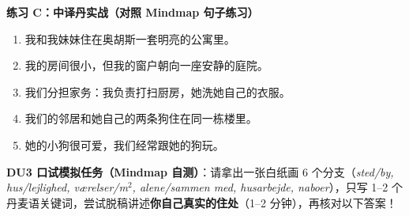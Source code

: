 \textbf{练习 C：中译丹实战（对照 Mindmap 句子练习）}
\begin{enumerate}
  \item 我和我妹妹住在奥胡斯一套明亮的公寓里。
  \item 我的房间很小，但我的窗户朝向一座安静的庭院。
  \item 我们分担家务：我负责打扫厨房，她洗她自己的衣服。
  \item 我们的邻居和她自己的两条狗住在同一栋楼里。
  \item 她的小狗很可爱，我们经常跟她的狗玩。
\end{enumerate}


\textbf{DU3 口试模拟任务（Mindmap 自测）}：请拿出一张白纸画 6 个分支（\textit{sted/by, hus/lejlighed, værelser/m$^2$, alene/sammen med, husarbejde, naboer}），只写 1--2 个丹麦语关键词，尝试脱稿讲述\textbf{你自己真实的住处}（1--2 分钟），再核对以下答案！


